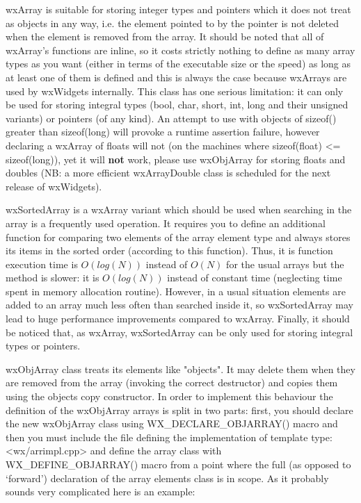 wxArray is suitable for storing integer types and pointers which it does not
treat as objects in any way, i.e. the element pointed to by the pointer is not
deleted when the element is removed from the array. It should be noted that
all of wxArray's functions are inline, so it costs strictly nothing to define as
many array types as you want (either in terms of the executable size or the
speed) as long as at least one of them is defined and this is always the case
because wxArrays are used by wxWidgets internally. This class has one serious
limitation: it can only be used for storing integral types (bool, char, short,
int, long and their unsigned variants) or pointers (of any kind). An attempt
to use with objects of sizeof() greater than sizeof(long) will provoke a
runtime assertion failure, however declaring a wxArray of floats will not (on
the machines where sizeof(float) <= sizeof(long)), yet it will {\bf not} work,
please use wxObjArray for storing floats and doubles (NB: a more efficient
wxArrayDouble class is scheduled for the next release of wxWidgets).

wxSortedArray is a wxArray variant which should be used when searching in the
array is a frequently used operation. It requires you to define an additional
function for comparing two elements of the array element type and always stores
its items in the sorted order (according to this function). Thus, it is 
  function execution time is $O(log(N))$ instead of
$O(N)$ for the usual arrays but the  method is
slower: it is $O(log(N))$ instead of constant time (neglecting time spent in
memory allocation routine). However, in a usual situation elements are added to
an array much less often than searched inside it, so wxSortedArray may lead to
huge performance improvements compared to wxArray. Finally, it should be
noticed that, as wxArray, wxSortedArray can be only used for storing integral
types or pointers.

wxObjArray class treats its elements like "objects". It may delete them when
they are removed from the array (invoking the correct destructor) and copies
them using the objects copy constructor. In order to implement this behaviour
the definition of the wxObjArray arrays is split in two parts: first, you should
declare the new wxObjArray class using WX\_DECLARE\_OBJARRAY() macro and then
you must include the file defining the implementation of template type:
<wx/arrimpl.cpp> and define the array class with WX\_DEFINE\_OBJARRAY() macro
from a point where the full (as opposed to `forward') declaration of the array
elements class is in scope. As it probably sounds very complicated here is an
example:

